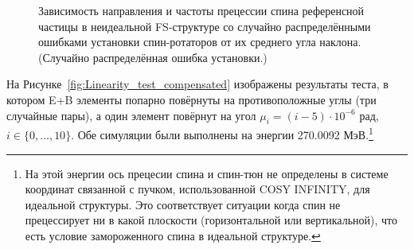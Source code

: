 \begin{figure}[!h]
	\centering\hfill
	\hfill
	\hfill
	\caption{Зависимость направления и частоты прецессии спина референсной частицы в неидеальной FS-структуре со случайно распределёнными ошибками установки спин-ротаторов от их среднего угла наклона. (Случайно распределённая ошибка установки.)\label{fig:Linearity_test_shifting_gauss}}
\end{figure}

На Рисунке~\ref{fig:Linearity_test_compensated} изображены результаты теста, в котором E+B элементы попарно повёрнуты на противоположные углы (три случайные пары), а один элемент повёрнут на угол
$\mu_i = (i-5)\cdot 10^{-6}$ рад, $i\in\lbrace0,\dots,10\rbrace$. Обе симуляции были выполнены на энергии
270.0092 МэВ.\footnote{На этой энергии ось прецесии спина и спин-тюн
	не определены в системе координат связанной с пучком, использованной
	COSY INFINITY, для идеальной структуры. Это соответствует ситуации
	когда спин не прецессирует ни в какой плоскости (горизонтальной или
	вертикальной), что есть условие замороженного спина в идеальной структуре.}

